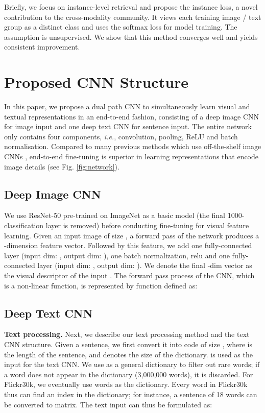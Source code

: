 \documentclass[10pt,final,journal]{IEEEtran}
\newcommand{\ie}{\mbox{\emph{i.e.}}}
\begin{document}
Briefly, we focus on instance-level retrieval and propose the instance loss, a novel contribution to the cross-modality community. It views each training image / text group as a distinct class and uses the softmax loss for model training. The assumption is unsupervised. We show that this method converges well and yields consistent improvement. 





\section{Proposed CNN Structure} \label{sec:model}
In this paper, we propose a dual path CNN to simultaneously learn visual and textual representations in an end-to-end fashion, consisting of a deep image CNN for image input and one deep text CNN for sentence input. The entire network only contains four components, \ie, convolution, pooling, ReLU and batch normalisation. Compared to many previous methods which use off-the-shelf image CNNs \cite{mao2014deep,klein2015associating,lin2016leveraging,lev2016rnn,wang2016learning,nam2016dual,huang2016instance,niu2017hierarchical,wang2017learning,reed2016learning}, end-to-end fine-tuning is superior in learning representations that encode image details (see Fig. \ref{fig:network}).


\subsection{Deep Image CNN} 
We use ResNet-50 \cite{he2016deep} pre-trained on ImageNet \cite{krizhevsky2012imagenet} as a basic model (the final 1000-classification layer is removed) before conducting fine-tuning for visual feature learning. Given an input image of size , a forward pass of the network produces a -dimension feature vector. Followed by this feature, we add one fully-connected layer (input dim: , output dim: ), one batch normalization, relu and one fully-connected layer (input dim: , output dim: ). We denote the final -dim vector  as the visual descriptor of the input . The forward pass process of the CNN, which is a non-linear function, is represented by function  defined as:


\subsection{Deep Text CNN}\label{sec:text_cnn}
\textbf{Text processing.} Next, we describe our text processing method and the text CNN structure.
Given a sentence, we first convert it into code  of size , where  is the length of the sentence, and  denotes the size of the dictionary.  is used as the input for the text CNN.  We use  \cite{mikolov2013efficient} as a general dictionary to filter out rare words; if a word does not appear in the  dictionary (3,000,000 words), it is discarded. For Flickr30k, we eventually use  words as the dictionary. Every word in Flickr30k thus can find an index  in the dictionary; for instance, a sentence of 18 words can be converted to  matrix. The text input  can thus be formulated as: 
\end{document}

